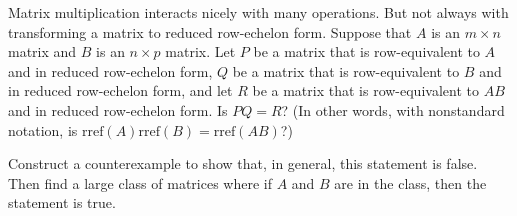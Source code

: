 Matrix multiplication interacts nicely with many operations.  But not always with transforming a matrix to reduced row-echelon form.  Suppose that $A$ is an $m\times n$ matrix and $B$ is an $n\times p$ matrix.  Let $P$ be a matrix that is row-equivalent to $A$ and in reduced row-echelon form, $Q$ be a matrix that is row-equivalent to $B$ and in reduced row-echelon form, and let $R$ be a matrix that is row-equivalent to $AB$ and in reduced row-echelon form.  Is $PQ=R$?  (In other words, with nonstandard notation, is $\text{rref}(A)\text{rref}(B)=\text{rref}(AB)$?)\par
%
Construct a counterexample to show that, in general, this statement is false.  Then find a large class of matrices where if $A$ and $B$ are in the class, then the statement is true.